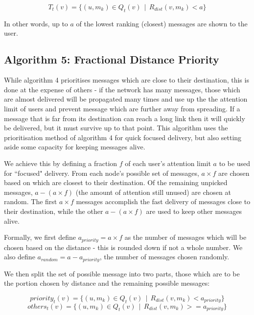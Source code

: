 \documentclass[bsc,frontabs,twoside,singlespacing,parskip,deptreport]{infthesis}     %
\begin{document}
\begin{equation}
T_{t}(v) = \{ (u, m_{k}) \in Q_{t}(v) \:\: | \:\: R_{dist}(v, m_{k}) < a \}
\end{equation}

In other words, up to $a$ of the lowest ranking (closest) messages are shown to the user.

\subsection{Algorithm 5: Fractional Distance Priority}
While algorithm 4 prioritises messages which are close to their destination, this is done at the expense of others - if the network has many messages, those which are almost delivered will be propagated many times and use up the the attention limit of users and prevent message which are further away from spreading. If a message that is far from its destination can reach a long link then it will quickly be delivered, but it must survive up to that point. This algorithm uses the prioritisation method of algorithm 4 for quick focused delivery, but also setting aside some capacity for keeping messages alive.

We achieve this by defining a fraction $f$ of each user's attention limit $a$ to be used for ``focused" delivery. From each node's possible set of messages, $a \times f$ are chosen based on which are closest to their destination. Of the remaining unpicked messages, $a - (a \times f)$ (the amount of attention still unused) are chosen at random. The first $a \times f$ messages accomplish the fast delivery of messages close to their destination, while the other $a - (a \times f)$ are used to keep other messages alive.

Formally, we first define $a_{priority} = a \times f$ as the number of messages which will be chosen based on the distance - this is rounded down if not a whole number. We also define $a_{random} = a - a_{priority}$, the number of messages chosen randomly.

We then split the set of possible message into two parts, those which are to be the portion chosen by distance and the remaining possible messages:

\begin{equation}
priority_{t}(v) = \{ (u, m_{k}) \in Q_{t}(v) \:\: | \:\: R_{dist}(v, m_{k}) < a_{priority} \}
\end{equation}
\begin{equation}
others_{t}(v) = \{ (u, m_{k}) \in Q_{t}(v) \:\: | \:\: R_{dist}(v, m_{k}) >= a_{priority} \}
\end{equation}
\end{document}

